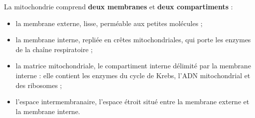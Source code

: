 \documentclass[11pt]{article}
\newcommand{\cle}[1]{{\popxbold\color{popdark}#1}}
\begin{document}
\begin{definition}
La mitochondrie comprend \textbf{deux membranes} et \textbf{deux compartiments} :
\begin{itemize}
\item la \cle{membrane externe}, lisse, perméable aux petites molécules ;
\item la \cle{membrane interne}, repliée en \cle{crêtes mitochondriales}, qui porte les enzymes de la chaîne respiratoire ;
\item la \cle{matrice mitochondriale}, le compartiment interne délimité par la membrane interne : elle contient les enzymes du cycle de Krebs, l'ADN mitochondrial et des ribosomes ;
\item l'\cle{espace intermembranaire}, l'espace étroit situé entre la membrane externe et la membrane interne.
\end{itemize}
\end{definition}
\end{document}
